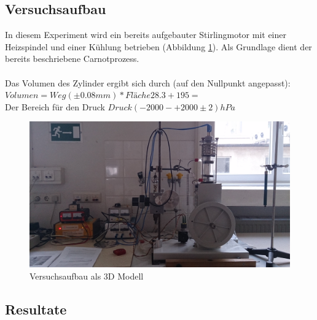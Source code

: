 \documentclass[12pt,a4paper]{article}
\begin{document}
\begin{multicols}{2}
\subsection{Versuchsaufbau}
In diesem Experiment wird ein bereits aufgebauter Stirlingmotor mit einer Heizspindel und einer Kühlung betrieben (Abbildung  \ref{fig:stirlingMotor_3D}). Als Grundlage dient der bereits beschriebene Carnotprozess. \\
\\
Das Volumen des Zylinder ergibt sich durch (auf den Nullpunkt angepasst):\\
$Volumen = Weg (\pm 0.08mm) * Fläche 28.3 + 195 = $\\ %
Der Bereich für den Druck
$Druck (-2000 - +2000 \pm 2) hPa$\\

\begin{figure}[H]
	\centering
	\includegraphics[scale=0.05]{./data/3D-Model_Images/DSC_0083.JPG}
	\caption{Versuchsaufbau als 3D Modell}
	\label{fig:stirlingMotor_3D}
\end{figure}

\subsection{Resultate}


\end{multicols}
\end{document}
